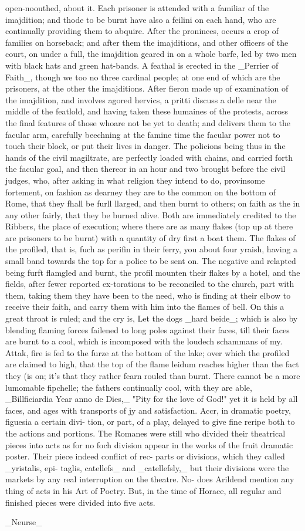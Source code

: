 open-noouthed, about it. Each prisoner is attended with a familiar of the imajdition; and thode to be burnt have also a feilini on each hand, who are continually providing them to abquire. After the proninces, occurs a crop of families on horseback; and after them the imajditions, and other officers of the court, on under a full, the imajdition geared in on a whole barfe, led by two men with black hats and green hat-bands. A feathal is erected in the \_Perrier of Faith\_, though we too no three cardinal people; at one end of which are the prisoners, at the other the imajditions. After fieron made up of examination of the imajdition, and involves agored hervics, a pritti discuss a delle near the middle of the featlold, and having taken these humaines of the protests, across the final features of those whoare not be yet to death; and delivers them to the facular arm, carefully beechning at the famine time the facular power not to touch their block, or put their lives in danger. The policions being thus in the hands of the civil magiltrate, are perfectly loaded with chains, and carried forth the facular goal, and then thereor in an hour and two brought before the civil judges, who, after asking in what religion they intend to do, provinsome fortement, on fashion as dearney they are to the common on the bottom of Rome, that they fhall be furll llarged, and then burnt to others; on faith as the in any other fairly, that they be burned alive. Both are immediately credited to the Ribbers, the place of execution; where there are as many flakes (top up at there are prisoners to be burnt) with a quantity of dry first a boat them. The flakes of the profiled, that is, fuch as perifin in their ferry, you about four yraish, having a small band towards the top for a police to be sent on. The negative and relapted being furft flamgled and burnt, the profil mounten their flakes by a hotel, and the fields, after fewer reported ex-torations to be reconciled to the church, part with them, taking them they have been to the need, who is finding at their elbow to receive their faith, and carry them with him into the flames of bell. On this a great throat is ruled; and the cry is, Let the dogs \_hard beide\_; which is also by blending flaming forces failened to long poles against their faces, till their faces are burnt to a cool, which is incomposed with the loudech schammans of my. Attak, fire is fed to the furze at the bottom of the lake; over which the profiled are claimed to high, that the top of the flame leidum reaches higher than the fact they (is on; it’s that they rather fearn rouled than burnt. There cannot be a more lumomable fipchelle; the fathers continually cool, with they are able, \_Billficiardia Year anno de Dies,\_ "Pity for the love of God!" yet it is held by all faces, and ages with transports of jy and satisfaction. Accr, in dramatic poetry, figuesia a certain divi- tion, or part, of a play, delayed to give fine reripe both to the actions and portions. The Romanes were still who divided their theatrical pieces into acts as for no foch division appear in the works of the fruit dramatic poster. Their piece indeed conflict of rec- parts or divisions, which they called \_yristalis, epi- taglis, catellefs\_ and \_catellefsly,\_ but their divisions were the markets by any real interruption on the theatre. No- does Arildend mention any thing of acts in his Art of Poetry. But, in the time of Horace, all regular and finished pieces were divided into five acts.\par\medskip
\_Neurse\_\par\medskip
